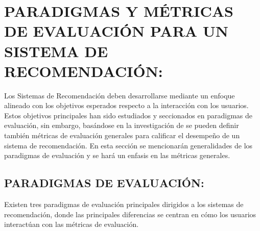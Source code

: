 \section{PARADIGMAS Y MÉTRICAS DE EVALUACIÓN PARA UN SISTEMA DE RECOMENDACIÓN: }

Los Sistemas de Recomendación deben desarrollarse mediante un enfoque alineado con los objetivos esperados respecto a la interacción con los usuarios. Estos objetivos principales han sido estudiados y seccionados en paradigmas de evaluación, sin embargo, basándose en la investigación de \parencite{Aggarwal2016} se pueden definir también métricas de evaluación generales para calificar el desempeño de un sistema de recomendación. En esta sección se mencionarán generalidades de los paradigmas de evaluación y se hará un enfasis en las métricas generales.

\subsection{PARADIGMAS DE EVALUACIÓN: }

Existen tres paradigmas de evaluación principales dirigidos a los sistemas de recomendación, donde las principales diferencias se centran en cómo los usuarios interactúan con las métricas de evaluación.

